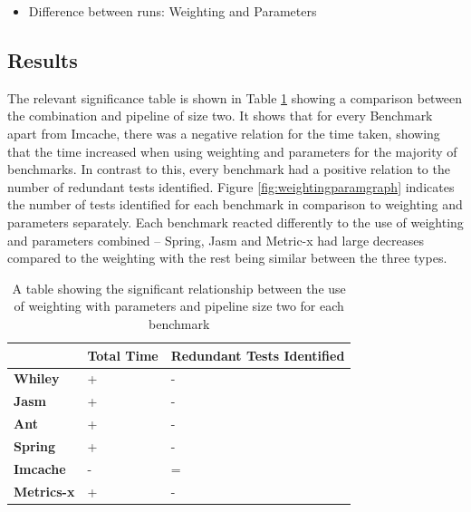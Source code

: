 \begin{itemize}
\item Difference between runs: Weighting and Parameters
\end{itemize}

\subsection{Results}
The relevant significance table is shown in Table \ref{weightingparamsig} showing a comparison between the combination and pipeline of size two. It shows that for every Benchmark apart from Imcache, there was a negative relation for the time taken, showing that the time increased when using weighting and parameters for the majority of benchmarks. In contrast to this, every benchmark had a positive relation to the number of redundant tests identified. Figure \ref{fig:weightingparamgraph} indicates the number of tests identified for each benchmark in comparison to weighting and parameters separately. Each benchmark reacted differently to the use of weighting and parameters combined -- Spring, Jasm and Metric-x had large decreases compared to the weighting with the rest being similar between the three types. 

\begin{table}[h]
\centering

\begin{tabular}{|l|l|l|}
\hline
{\bf }          & {\bf Total Time} & {\bf Redundant Tests Identified} \\ \hline
{\bf Whiley}    & +                & -                           \\ \hline
{\bf Jasm}      & +                & -                           \\ \hline
{\bf Ant}       & +                & -                           \\ \hline
{\bf Spring}    & +                & -                           \\ \hline
{\bf Imcache}   & -                & =                           \\ \hline
{\bf Metrics-x} & +                & -                           \\ \hline
\end{tabular}
\caption{A table showing the significant relationship between the use of weighting with parameters and pipeline size two for each benchmark}
\label{weightingparamsig}
\end{table}

